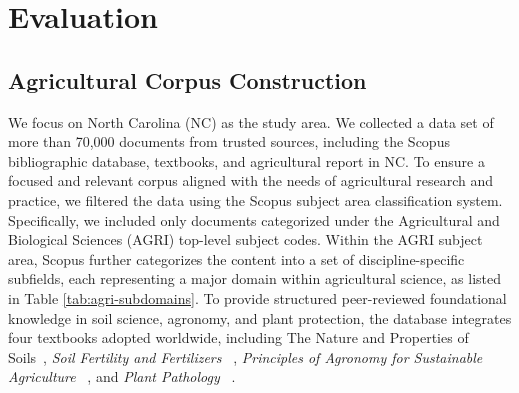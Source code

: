 \documentclass{ieeeaccess}
\begin{document}
\section{Evaluation}
\label{sec:evaluation}

\subsection{Agricultural Corpus Construction}
We focus on North Carolina (NC) as the study area. We collected a data set of more than 70,000 documents from trusted sources, including the Scopus bibliographic database, textbooks, and agricultural report in NC. To ensure a focused and relevant corpus aligned with the needs of agricultural research and practice, we filtered the data using the Scopus subject area classification system. Specifically, we included only documents categorized under the Agricultural and Biological Sciences (AGRI) top-level subject codes. Within the AGRI subject area, Scopus further categorizes the content into a set of discipline-specific subfields, each representing a major domain within agricultural science, as listed in Table \ref{tab:agri-subdomains}. To provide structured peer-reviewed foundational knowledge in soil science, agronomy, and plant protection, the database integrates four textbooks adopted worldwide, including The Nature and Properties of Soils~\cite{bradyweilsol}, \textit{Soil Fertility and Fertilizers} ~\cite{havlinfertilizer}, \textit{Principles of Agronomy for Sustainable Agriculture} ~\cite{reddyagronomy}, and \textit{Plant Pathology} ~\cite{agriosplant}.
\end{document}
